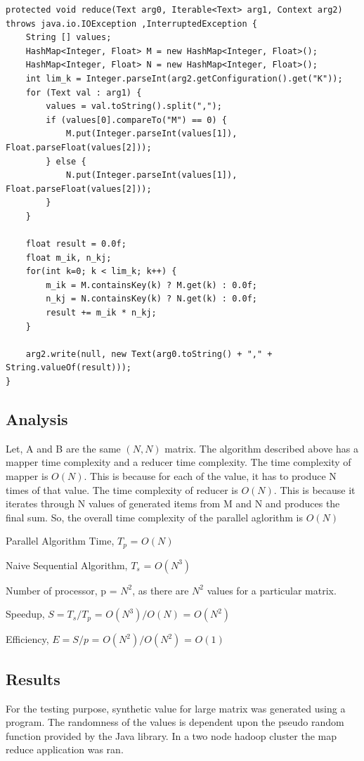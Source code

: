 \documentclass{article}
\begin{document}
\begin{lstlisting}[caption={Matrix multiplication reducer code snippet},label={lst:mmred},style=MyJavaStyle]
protected void reduce(Text arg0, Iterable<Text> arg1, Context arg2) throws java.io.IOException ,InterruptedException {
    String [] values;
    HashMap<Integer, Float> M = new HashMap<Integer, Float>();
    HashMap<Integer, Float> N = new HashMap<Integer, Float>();
    int lim_k = Integer.parseInt(arg2.getConfiguration().get("K"));
    for (Text val : arg1) {
        values = val.toString().split(",");
        if (values[0].compareTo("M") == 0) {
            M.put(Integer.parseInt(values[1]), Float.parseFloat(values[2]));
        } else {
            N.put(Integer.parseInt(values[1]), Float.parseFloat(values[2]));
        }
    }
		
    float result = 0.0f;
    float m_ik, n_kj;
    for(int k=0; k < lim_k; k++) {
        m_ik = M.containsKey(k) ? M.get(k) : 0.0f;
        n_kj = N.containsKey(k) ? N.get(k) : 0.0f;
        result += m_ik * n_kj;
    }
		
    arg2.write(null, new Text(arg0.toString() + "," + String.valueOf(result)));
}
\end{lstlisting}

\subsection{Analysis}
Let, A and B are the same $(N,N)$ matrix.
The algorithm described above has a mapper time complexity and a reducer time complexity.
The time complexity of mapper is ${O(N)}$. This is because for each of the value, it has to produce N times of that value.
The time complexity of reducer is ${O(N)}$. This is because it iterates through N values of generated items from M and N and produces the final sum.
So, the overall time complexity of the parallel aglorithm is ${O(N)}$\BlankLine

Parallel Algorithm Time, ${T_{p}}$ = ${O(N)}$

Naive Sequential Algorithm, ${T_{s}}$ = ${O(N^3)}$

Number of processor, p = ${N^2}$, as there are ${N^2}$ values for a particular matrix.

Speedup, ${S = T_{s}/T_{p}}$ = ${O(N^3)/O(N)}$ = ${O(N^2)}$

Efficiency, ${E = S/p}$ = ${O(N^2) / O(N^2)}$ = ${O(1)}$ 

\subsection{Results}
For the testing purpose, synthetic value for large matrix was generated using a program. The randomness of the values is dependent upon the pseudo random function provided by the Java library. In a two node hadoop cluster the map reduce application was ran.\BlankLine
\end{document}
